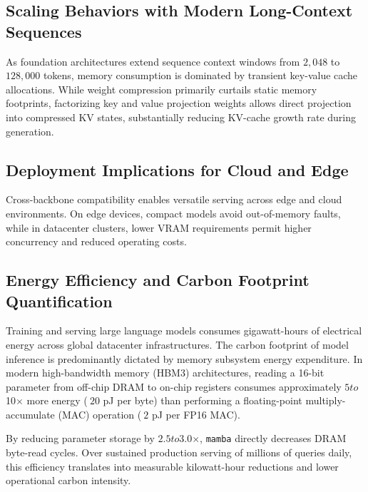 \subsection{Scaling Behaviors with Modern Long-Context Sequences}
As foundation architectures extend sequence context windows from $2{,}048$ to $128{,}000$ tokens, memory consumption is dominated by transient key-value cache allocations. While weight compression primarily curtails static memory footprints, factorizing key and value projection weights allows direct projection into compressed KV states, substantially reducing KV-cache growth rate during generation.

\subsection{Deployment Implications for Cloud and Edge}
Cross-backbone compatibility enables versatile serving across edge and cloud environments. On edge devices, compact models avoid out-of-memory faults, while in datacenter clusters, lower VRAM requirements permit higher concurrency and reduced operating costs.

\subsection{Energy Efficiency and Carbon Footprint Quantification}
Training and serving large language models consumes gigawatt-hours of electrical energy across global datacenter infrastructures. The carbon footprint of model inference is predominantly dictated by memory subsystem energy expenditure. In modern high-bandwidth memory (HBM3) architectures, reading a 16-bit parameter from off-chip DRAM to on-chip registers consumes approximately $5$\times$ to $10$\times$ more energy ($~20$ pJ per byte) than performing a floating-point multiply-accumulate (MAC) operation ($~2$ pJ per FP16 MAC).

By reducing parameter storage by $2.5$\times$ to $3.0$\times$, \texttt{mamba} directly decreases DRAM byte-read cycles. Over sustained production serving of millions of queries daily, this efficiency translates into measurable kilowatt-hour reductions and lower operational carbon intensity.
